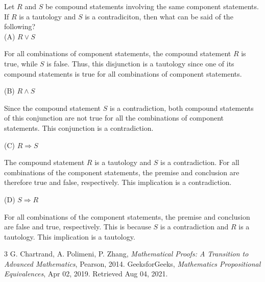 \documentclass[12pt]{article}
\newenvironment{problem}[2][Problem]{\begin{trivlist}
		\item[\hskip \labelsep {\bfseries #1}\hskip \labelsep {\bfseries #2.}]}{\end{trivlist}}
\newenvironment{solution}[2][Solution]{\begin{trivlist}
		\item[\hskip \labelsep {\bfseries #1}\hskip \labelsep {\bfseries #2.}]}{\end{trivlist}}
\begin{document}
\begin{problem}{50}
	Let $R$ and $S$ be compound statements involving the same component statements. If $R$ is a tautology and $S$ is a contradiciton, then what can be said of the following?\\
	
	(A) $R \vee S$
	\begin{solution}{a}
		For all combinations of component statements, the compound statement $R$ is true, while $S$ is false. Thus, this disjunction is a tautology since one of its compound statements is true for all combinations of component statements.
	\end{solution}
	(B) $R \wedge S$
	\begin{solution}{b}
		Since the compound statement $S$ is a contradiction, both compound statements of this conjunction are not  true for all the combinations of component statements. This conjunction is a contradiction.
	\end{solution}
	(C) $R \Rightarrow S$
	\begin{solution}{c}
		The compound statement $R$ is a tautology and $S$ is a contradiction. For all combinations of the component statements, the premise and conclusion are therefore  true and false, respectively. This implication is a contradiction.
	\end{solution}
	(D) $S \Rightarrow R$
	\begin{solution}{d}
		For all combinations of the component statements, the premise and conclusion are false and true, respectively. This is because $S$ is a contradiction and $R$ is a tautology. This implication is a tautology.
	\end{solution}
\end{problem}
\begin{thebibliography}{3}
	G. Chartrand,  A. Polimeni, P. Zhang, 
	\textit{Mathematical Proofs: A Transition to Advanced Mathematics}, Pearson, 2014.
	GeeksforGeeks, \textit{Mathematics Propositional Equivalences}, Apr 02, 2019. Retrieved Aug 04, 2021.
\end{thebibliography}
\end{document}
